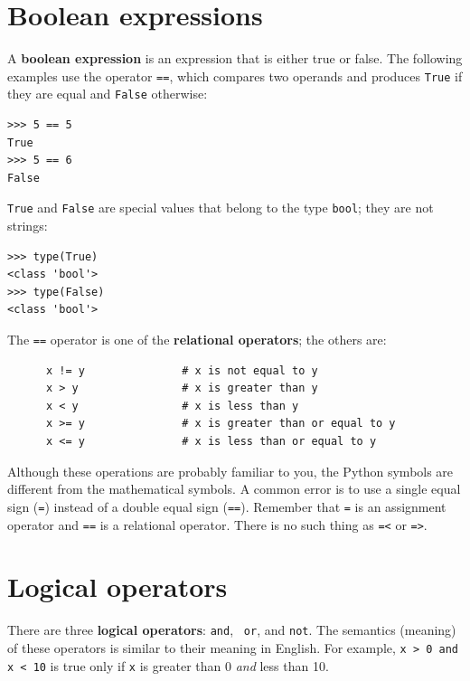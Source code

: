 \documentclass[10pt]{book}
\begin{document}
\section{Boolean expressions}

A {\bf boolean expression} is an expression that is either true
or false.  The following examples use the 
operator {\tt ==}, which compares two operands and produces
{\tt True} if they are equal and {\tt False} otherwise:

\beforeverb
\begin{verbatim}
>>> 5 == 5
True
>>> 5 == 6
False
\end{verbatim}
\afterverb
%
{\tt True} and {\tt False} are special
values that belong to the type {\tt bool}; they are not strings:


\beforeverb
\begin{verbatim}
>>> type(True)
<class 'bool'>
>>> type(False)
<class 'bool'>
\end{verbatim}
\afterverb
%
The {\tt ==} operator is one of the {\bf relational operators}; the
others are:

\beforeverb
\begin{verbatim}
      x != y               # x is not equal to y
      x > y                # x is greater than y
      x < y                # x is less than y
      x >= y               # x is greater than or equal to y
      x <= y               # x is less than or equal to y
\end{verbatim}
\afterverb
%
Although these operations are probably familiar to you, the Python
symbols are different from the mathematical symbols.  A common error
is to use a single equal sign ({\tt =}) instead of a double equal sign
({\tt ==}).  Remember that {\tt =} is an assignment operator and
{\tt ==} is a relational operator.   There is no such thing as
{\tt =<} or {\tt =>}.



\section {Logical operators}

There are three {\bf logical operators}: {\tt and}, {\tt
or}, and {\tt not}.  The semantics (meaning) of these operators is
similar to their meaning in English.  For example,
{\tt x > 0 and x < 10} is true only if {\tt x} is greater than 0
{\em and} less than 10.
\end{document}
